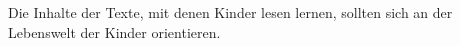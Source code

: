 Die Inhalte der Texte, mit denen Kinder lesen lernen, sollten sich an der Lebenswelt der Kinder orientieren.